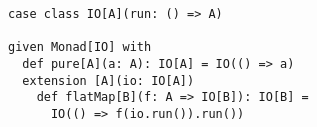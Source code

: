 \begin{algorithm}

\begin{verbatim}
case class IO[A](run: () => A)

given Monad[IO] with
  def pure[A](a: A): IO[A] = IO(() => a)
  extension [A](io: IO[A])
    def flatMap[B](f: A => IO[B]): IO[B] =
      IO(() => f(io.run()).run())
\end{verbatim}

\caption{Naive IO monad in Scala. %
\label{monad:io}}
\end{algorithm}